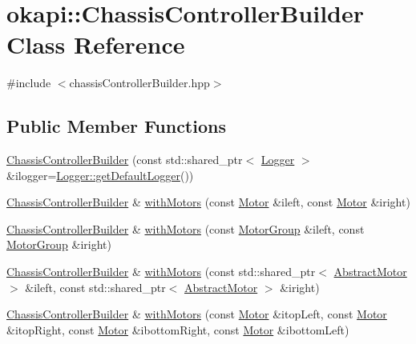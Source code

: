 \hypertarget{classokapi_1_1ChassisControllerBuilder}{}\section{okapi\+::Chassis\+Controller\+Builder Class Reference}
\label{classokapi_1_1ChassisControllerBuilder}


{\ttfamily \#include $<$chassis\+Controller\+Builder.\+hpp$>$}

\subsection*{Public Member Functions}
\begin{DoxyCompactItemize}
\item 
\mbox{\hyperlink{classokapi_1_1ChassisControllerBuilder_a47e82afd7b6f3e3076d153e6130820ed}{Chassis\+Controller\+Builder}} (const std\+::shared\+\_\+ptr$<$ \mbox{\hyperlink{classokapi_1_1Logger}{Logger}} $>$ \&ilogger=\mbox{\hyperlink{classokapi_1_1Logger_a5053cf778b4b55acba788a3797dc96d2}{Logger\+::get\+Default\+Logger}}())
\item 
\mbox{\hyperlink{classokapi_1_1ChassisControllerBuilder}{Chassis\+Controller\+Builder}} \& \mbox{\hyperlink{classokapi_1_1ChassisControllerBuilder_a1ceb7c4b4f0ccfd37a92d8ffd64fa64e}{with\+Motors}} (const \mbox{\hyperlink{classokapi_1_1Motor}{Motor}} \&ileft, const \mbox{\hyperlink{classokapi_1_1Motor}{Motor}} \&iright)
\item 
\mbox{\hyperlink{classokapi_1_1ChassisControllerBuilder}{Chassis\+Controller\+Builder}} \& \mbox{\hyperlink{classokapi_1_1ChassisControllerBuilder_a98b304ce096222c0f3af8105ab61ee71}{with\+Motors}} (const \mbox{\hyperlink{classokapi_1_1MotorGroup}{Motor\+Group}} \&ileft, const \mbox{\hyperlink{classokapi_1_1MotorGroup}{Motor\+Group}} \&iright)
\item 
\mbox{\hyperlink{classokapi_1_1ChassisControllerBuilder}{Chassis\+Controller\+Builder}} \& \mbox{\hyperlink{classokapi_1_1ChassisControllerBuilder_a4482565290d9433bff4dc6c48543e334}{with\+Motors}} (const std\+::shared\+\_\+ptr$<$ \mbox{\hyperlink{classokapi_1_1AbstractMotor}{Abstract\+Motor}} $>$ \&ileft, const std\+::shared\+\_\+ptr$<$ \mbox{\hyperlink{classokapi_1_1AbstractMotor}{Abstract\+Motor}} $>$ \&iright)
\item 
\mbox{\hyperlink{classokapi_1_1ChassisControllerBuilder}{Chassis\+Controller\+Builder}} \& \mbox{\hyperlink{classokapi_1_1ChassisControllerBuilder_a0d0a144c1b600aa90cf19b6a76a7dd04}{with\+Motors}} (const \mbox{\hyperlink{classokapi_1_1Motor}{Motor}} \&itop\+Left, const \mbox{\hyperlink{classokapi_1_1Motor}{Motor}} \&itop\+Right, const \mbox{\hyperlink{classokapi_1_1Motor}{Motor}} \&ibottom\+Right, const \mbox{\hyperlink{classokapi_1_1Motor}{Motor}} \&ibottom\+Left)

\end{DoxyCompactItemize}
